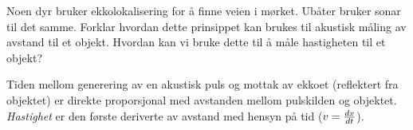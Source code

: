

Noen dyr bruker ekkolokalisering for å finne veien i mørket. Ubåter bruker sonar til det samme. Forklar hvordan dette prinsippet kan brukes til akustisk måling av avstand til et objekt. Hvordan kan vi bruke dette til å måle hastigheten til et objekt?







Tiden mellom generering av en akustisk puls og mottak av ekkoet (reflektert fra objektet) er direkte proporsjonal med avstanden mellom pulskilden og objektet. \textit{Hastighet} er den første deriverte av avstand med hensyn på tid ($v = {dx \over dt}$).










